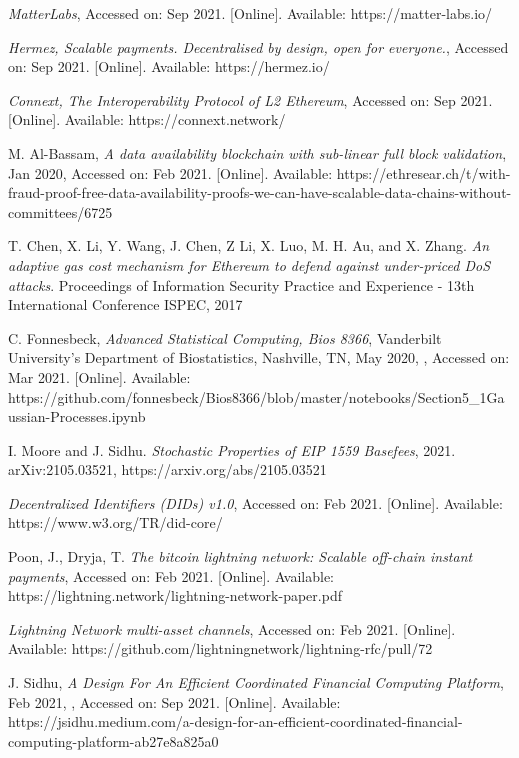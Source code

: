 \documentclass[peerreview]{ieeesyscoin}
\begin{document}
\begin{thebibliography}{00}
  \textit{MatterLabs}, Accessed on: Sep 2021. [Online]. Available: https://matter-labs.io/

  \textit{Hermez, Scalable payments. Decentralised by design, open for everyone.}, Accessed on: Sep 2021. [Online]. Available: https://hermez.io/

  \textit{Connext, The Interoperability Protocol of L2 Ethereum}, Accessed on: Sep 2021. [Online]. Available: https://connext.network/

 M. Al-Bassam,\textit{ A data availability blockchain with sub-linear full block validation}, Jan 2020, Accessed on: Feb 2021.  [Online]. Available:  https://ethresear.ch/t/with-fraud-proof-free-data-availability-proofs-we-can-have-scalable-data-chains-without-committees/6725

  T. Chen, X. Li, Y. Wang, J. Chen, Z Li, X. Luo, M. H. Au, and X. Zhang. \textit{An adaptive gas cost mechanism for Ethereum to defend against under-priced DoS attacks}. Proceedings of Information Security Practice and Experience - 13th International Conference ISPEC, 2017



 C. Fonnesbeck, \textit{Advanced Statistical Computing, Bios 8366}, Vanderbilt University's Department of Biostatistics, Nashville, TN, May 2020, , Accessed on: Mar 2021.  [Online]. Available:  https://github.com/fonnesbeck/Bios8366/blob/master/notebooks/Section5\_1\-Gaussian-Processes.ipynb

  I. Moore and J. Sidhu. \textit{Stochastic Properties of EIP 1559 Basefees}, 2021. arXiv:2105.03521,  https://arxiv.org/abs/2105.03521

  \textit{Decentralized Identifiers (DIDs) v1.0}, Accessed on: Feb 2021. [Online]. Available: https://www.w3.org/TR/did-core/

  Poon, J., Dryja, T. \textit{The bitcoin lightning network: Scalable off-chain instant payments}, Accessed on: Feb 2021. [Online]. Available: https://lightning.network/lightning-network-paper.pdf

  \textit{Lightning Network multi-asset channels}, Accessed on: Feb 2021. [Online]. Available: https://github.com/lightningnetwork/lightning-rfc/pull/72

 J. Sidhu, \textit{A Design For An Efficient Coordinated Financial Computing Platform}, Feb 2021, , Accessed on: Sep 2021.  [Online]. Available:  https://jsidhu.medium.com/a-design-for-an-efficient-coordinated-financial-computing-platform-ab27e8a825a0




\end{thebibliography}


\EOD
\end{document}
